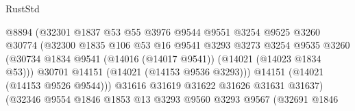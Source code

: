 \begin{lexlean}{RustStd}
\begin{coremodule}
                                          @8894
                                          (@32301
                                            @1837
                                            @53
                                            @55
                                            @3976
                                            @9544
                                            @9551
                                            @3254
                                            @9525
                                            @3260
                                            @30774
                                            (@32300
                                              @1835
                                              @106
                                              @53
                                              @16
                                              @9541
                                              @3293
                                              @3273
                                              @3254
                                              @9535
                                              @3260
                                              (@30734
                                                @1834
                                                @9541
                                                (@14016 (@14017 @9541))
                                                (@14021 (@14023 @1834 @53)))
                                              @30701
                                              @14151
                                              (@14021 (@14153 @9536 @3293)))
                                            @14151
                                            (@14021 (@14153 @9526 @9544)))
                                          @31616
                                          @31619
                                          @31622
                                          @31626
                                          @31631
                                          @31637)
                                        (@32346
                                          @9554
                                          @1846
                                          @1853
                                          @13
                                          @3293
                                          @9560
                                          @3293
                                          @9567
                                          (@32691
                                            @1846

\end{coremodule}
\end{lexlean}
